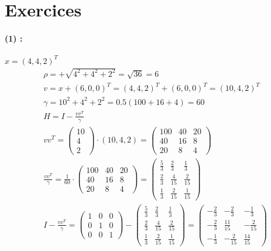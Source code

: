 \documentclass[11pt,a4paper]{report}
\newcommand{\matddd}[3]{\begin{pmatrix}#1\\#2\\#3\end{pmatrix}}
\begin{document}
\section{Exercices}

\paragraph*{(1) : } $x=(4,4,2)^T$
\begin{align*}
& \rho = + \sqrt{4^2+4^2+2^2} = \sqrt{36} = 6 \\
& v = x + (6,0,0)^T = (4,4,2)^T+(6,0,0)^T = (10,4,2)^T \\
& \gamma = 10^2+4^2+2^2 = 0.5(100 + 16 + 4) = 60 \\
& H = I - \frac{vv^T}{\gamma} \\
& vv^T = \matddd{10}{4}{2} \cdot (10,4,2) = \begin{pmatrix}
100 & 40 & 20 \\
40  & 16 & 8  \\
20  & 8  & 4
\end{pmatrix}\\
&\frac{vv^T}{\gamma} = \frac{1}{60} \cdot \begin{pmatrix}
100 & 40 & 20 \\
40  & 16 & 8  \\
20  & 8  & 4
\end{pmatrix} = \begin{pmatrix}
\frac{5}{3} & \frac{2}{3} & \frac{1}{3} \\
\frac{2}{3} & \frac{4}{15} & \frac{2}{15}  \\
\frac{1}{3} & \frac{2}{15}  & \frac{1}{15}
\end{pmatrix}\\
& I - \frac{vv^T}{\gamma} = \begin{pmatrix}
1 & 0 & 0 \\
0 & 1 & 0 \\
0 & 0 & 1
\end{pmatrix} - \begin{pmatrix}
\frac{5}{3} & \frac{2}{3} & \frac{1}{3} \\
\frac{2}{3} & \frac{4}{15} & \frac{2}{15}  \\
\frac{1}{3} & \frac{2}{15}  & \frac{1}{15}
\end{pmatrix} =
\begin{pmatrix}
-\frac{2}{3} & -\frac{2}{3} & -\frac{1}{3} \\
-\frac{2}{3} & \frac{11}{15} & -\frac{2}{15} \\
-\frac{1}{3} & -\frac{2}{15} & \frac{14}{15} 
\end{pmatrix}
\end{align*}
\end{document}
